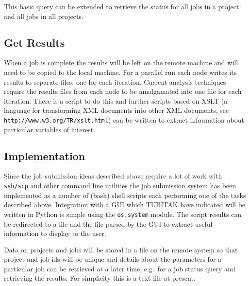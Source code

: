 This basic query can be extended to retrieve the status for all jobs in a project and all jobs in all projects.

\subsection{Get Results}

When a job is complete the results will be left on the remote machine and will need to be copied to the local machine. For a parallel run each node writes its results to separate files, one for each iteration. Current analysis techniques require the results files from each node to be amalgamated into one file for each iteration. There is a script to do this and further scripts based on XSLT (a language for transforming XML documents into other XML documents, see \verb+http://www.w3.org/TR/xslt.html+) can be written to extract information about particular variables of interest.

\subsection{Implementation}

Since the job submission ideas described above require a lot of work with \texttt{ssh/scp} and other command line utilities the job submission system has been implemented as a number of (bash) shell scripts each performing one of the tasks described above. Integration with a GUI which TUBITAK have indicated will be written in Python is simple using the \texttt{os.system} module. The script results can be redirected to a file and the file parsed by the GUI to extract useful information to display to the user.

Data on projects and jobs will be stored in a file on the remote system so that project and job ids will be unique and details about the parameters for a particular job can be retrieved at a later time, e.g.\ for a job status query and retrieving the results. For simplicity this is a text file at present.

